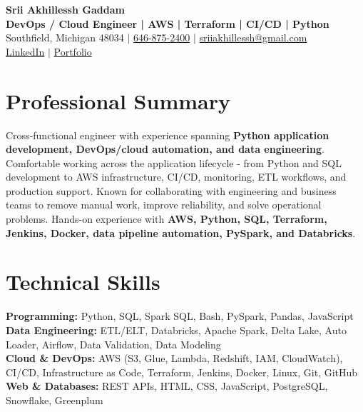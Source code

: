 \documentclass[letterpaper,10pt]{article}
\begin{document}
\fontsize{9.35pt}{10.45pt}\selectfont

\begin{center}
    {\LARGE \textbf{Srii Akhillessh Gaddam}} \\[-1pt]
    \textbf{DevOps / Cloud Engineer | AWS | Terraform | CI/CD | Python} \\[2pt]
    Southfield, Michigan 48034 $|$
    \href{tel:6468752400}{646-875-2400} $|$
    \href{mailto:sriiakhillessh@gmail.com}{sriiakhillessh@gmail.com} \\[1pt]
    \href{https://www.linkedin.com/in/srii-akhiilessh-gaddam-b48668191/}{LinkedIn} $|$
    \href{https://sriiakhillesshg.github.io/portfolio/}{Portfolio}
\end{center}
\vspace{-8pt}

\section{Professional Summary}
\small{Cross-functional engineer with experience spanning \textbf{Python application development, DevOps/cloud automation, and data engineering}. Comfortable working across the application lifecycle - from Python and SQL development to AWS infrastructure, CI/CD, monitoring, ETL workflows, and production support. Known for collaborating with engineering and business teams to remove manual work, improve reliability, and solve operational problems. Hands-on experience with \textbf{AWS, Python, SQL, Terraform, Jenkins, Docker, data pipeline automation, PySpark, and Databricks}.}

\section{Technical Skills}
\small{
\textbf{Programming:} Python, SQL, Spark SQL, Bash, PySpark, Pandas, JavaScript \\
\textbf{Data Engineering:} ETL/ELT, Databricks, Apache Spark, Delta Lake, Auto Loader, Airflow, Data Validation, Data Modeling \\
\textbf{Cloud \& DevOps:} AWS (S3, Glue, Lambda, Redshift, IAM, CloudWatch), CI/CD, Infrastructure as Code, Terraform, Jenkins, Docker, Linux, Git, GitHub \\
\textbf{Web \& Databases:} REST APIs, HTML, CSS, JavaScript, PostgreSQL, Snowflake, Greenplum
}
\end{document}
